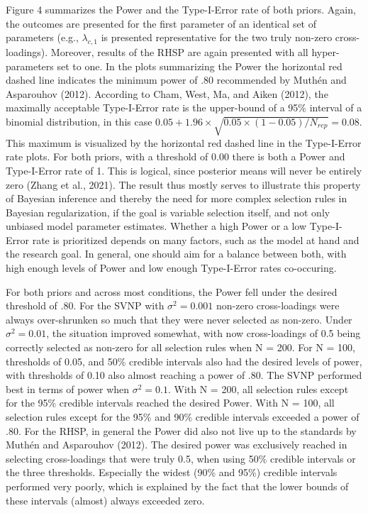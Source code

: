 \documentclass[
  man, donotrepeattitle,floatsintext]{apa6}
\begin{document}
Figure 4 summarizes the Power and the Type-I-Error rate of both priors. Again, the outcomes are presented for the first parameter of an identical set of parameters (e.g., \(\lambda_{c,1}\) is presented representative for the two truly non-zero cross-loadings). Moreover, results of the RHSP are again presented with all hyper-parameters set to one. In the plots summarizing the Power the horizontal red dashed line indicates the minimum power of .80 recommended by Muthén and Asparouhov (2012). According to Cham, West, Ma, and Aiken (2012), the maximally acceptable Type-I-Error rate is the upper-bound of a 95\% interval of a binomial distribution, in this case \(0.05 + 1.96 \times \sqrt{0.05 \times (1-0.05)/ N_{rep}} = 0.08\). This maximum is visualized by the horizontal red dashed line in the Type-I-Error rate plots. For both priors, with a threshold of 0.00 there is both a Power and Type-I-Error rate of 1. This is logical, since posterior means will never be entirely zero (Zhang et al., 2021). The result thus mostly serves to illustrate this property of Bayesian inference and thereby the need for more complex selection rules in Bayesian regularization, if the goal is variable selection itself, and not only unbiased model parameter estimates. Whether a high Power or a low Type-I-Error rate is prioritized depends on many factors, such as the model at hand and the research goal. In general, one should aim for a balance between both, with high enough levels of Power and low enough Type-I-Error rates co-occuring.

For both priors and across most conditions, the Power fell under the desired threshold of .80. For the SVNP with \(\sigma^2 = 0.001\) non-zero cross-loadings were always over-shrunken so much that they were never selected as non-zero. Under \(\sigma^2 = 0.01\), the situation improved somewhat, with now cross-loadings of 0.5 being correctly selected as non-zero for all selection rules when N = 200. For N = 100, thresholds of 0.05, and 50\% credible intervals also had the desired levels of power, with thresholds of 0.10 also almost reaching a power of .80. The SVNP performed best in terms of power when \(\sigma^2 = 0.1\). With N = 200, all selection rules except for the 95\% credible intervals reached the desired Power. With N = 100, all selection rules except for the 95\% and 90\% credible intervals exceeded a power of .80. For the RHSP, in general the Power did also not live up to the standards by Muthén and Asparouhov (2012). The desired power was exclusively reached in selecting cross-loadings that were truly 0.5, when using 50\% credible intervals or the three thresholds. Especially the widest (90\% and 95\%) credible intervals performed very poorly, which is explained by the fact that the lower bounds of these intervals (almost) always exceeded zero.
\end{document}
